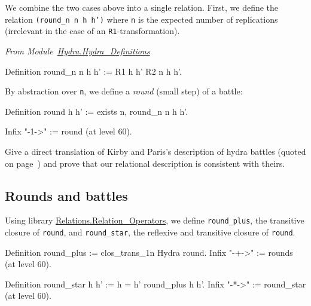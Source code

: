 \documentclass[a4paper]{book}
\begin{document}
We combine the two cases above into a single relation.
First,  we define the  relation \texttt{(round\_n n h h')} where \texttt{n} is the expected number of  replications (irrelevant in the case of an \texttt{R1}-transformation).

\vspace{4pt}
\emph{From Module~\href{../src/html/hydras.Hydra.Hydra_Definitions.html\#round_n}{Hydra.Hydra\_Definitions}}


\begin{Coqsrc}
Definition round_n n h h' := R1 h h' \/ R2 n h h'.  
\end{Coqsrc}

By abstraction over \texttt{n}, we define a \emph{round} (small step) of a battle:

\label{sect:infix-round}
\begin{Coqsrc}
Definition round h h' := exists n,  round_n n h h'.

Infix "-1->" := round (at level 60).
\end{Coqsrc}


\begin{project}
Give a direct translation of Kirby and Paris's description of hydra battles (quoted on page~\pageref{original-rules}) and prove that our relational description is consistent with theirs.
\end{project}


\subsection{Rounds and battles}


Using library \href{https://coq.inria.fr/distrib/current/stdlib/Coq.Relations.Relation_Operators.html}{Relations.Relation\_Operators}, we define \texttt{round\_plus},  the transitive closure of \texttt{round}, and \texttt{round\_star},  the reflexive and transitive closure of \texttt{round}.

\label{sect:infix-rounds} 

\begin{Coqsrc}
Definition round_plus := clos_trans_1n Hydra round.
Infix "-+->" := rounds (at level 60).

Definition round_star h h' := h = h' \/ round_plus h h'.
Infix "-*->" := round_star (at level 60).
\end{Coqsrc}
\end{document}
